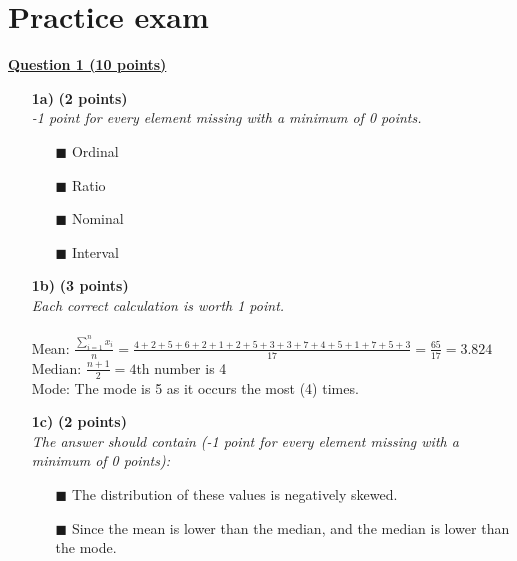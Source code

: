 
\section{Practice exam}

\selectfont 

\underline{\textbf{Question 1 (10 points)}} \\

\begin{itemize}
    \item[\textbf{1a)}] \textbf{(2 points)} \\ 
    \textit{-1 point for every element missing with a minimum of 0 points.}
        \begin{itemize}
        \item[$\blacksquare$] Ordinal        
        \item[$\blacksquare$] Ratio
        \item[$\blacksquare$] Nominal
        \item[$\blacksquare$] Interval 
        \end{itemize}
        
     \item[\textbf{1b)}] \textbf{(3 points)} \\
     \textit{Each correct calculation is worth 1 point.}   \\
     \\
     Mean: $\frac{\sum_{i = 1}^n x_i}{n} = \frac{4 + 2 + 5 + 6 + 2 + 1 + 2 + 5 + 3 + 3 + 7 + 4 + 5 + 1 + 7 + 5 + 3}{17} = \frac{65}{17} = 3.824$\\
     Median: $\frac{n + 1}{2} = 4$th number is 4\\
     Mode: The mode is 5 as it occurs the most (4) times.
     
     \item[\textbf{1c)}] \textbf{(2 points)} \\
     \textit{The answer should contain (-1 point for every element missing with a minimum of 0 points):}
    \begin{itemize}
    \item[$\blacksquare$] The distribution of these values is negatively skewed.        
    \item[$\blacksquare$] Since the mean is lower than the median, and the median is 
lower than the mode.
    \end{itemize}
     

\end{itemize}
